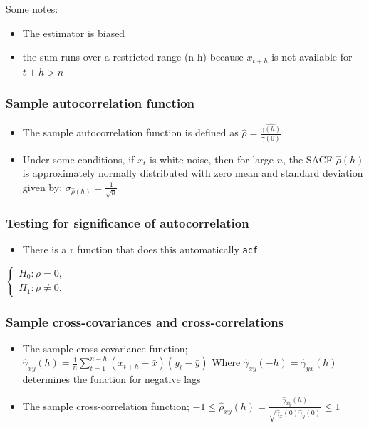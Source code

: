 \documentclass{article}
\begin{document}
\noindent Some notes:
\begin{itemize}
    \item The estimator is biased
    \item the sum runs over a restricted range (n-h) because $x_{t+h}$ is not available for $t+h > n$
\end{itemize}


\subsubsection{Sample autocorrelation function}

\begin{itemize}
    \item The sample autocorrelation function is defined as
    \subitem $\hat{\rho} = \frac{\hat{\gamma(h)}}{\gamma(0)}$
    \item Under some conditions, if $x_t$ is white noise, then for large $n$, the SACF $\hat{\rho}(h)$ is approximately normally distributed with zero mean and standard deviation given by;
    \subitem $\sigma_{\hat{\rho}(h)} = \frac{1}{\sqrt{n}}$
\end{itemize}


\subsubsection{Testing for significance of autocorrelation}


\begin{itemize}
    \item There is a r function that does this automatically \texttt{acf}
\end{itemize}

$
\begin{cases}
  H_0: \rho = 0,\\
  H_1: \rho \neq 0.
\end{cases}
$

\subsubsection{Sample cross-covariances and cross-correlations}
\begin{itemize}
    \item The sample cross-covariance function;
    \subitem $\hat{\gamma}_{xy} (h) = \frac{1}{n} \sum_{t=1}^{n-h} (x_{t+h} - \bar{x})(y_t - \bar{y})$ \hspace{1cm} Where $\hat{\gamma}_{xy} (-h) = \hat{\gamma}_{yx}(h)$ determines the function for negative lags
    \item The sample cross-correlation function;
    \subitem $-1 \leq \hat{\rho}_{xy}(h) = \frac{\hat{\gamma}_{xy}(h)}{\sqrt{\hat{\gamma}_x(0) \hat{\gamma}_y(0)}} \leq 1$
\end{itemize}
\end{document}
